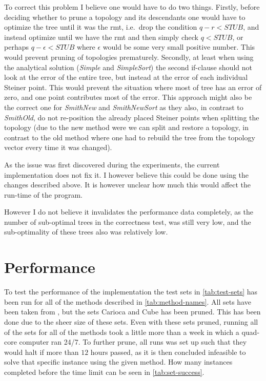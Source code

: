 To correct this problem I believe one would have to do two things. Firstly,
before deciding whether to prune a topology and its descendants one would have
to optimize the tree until it was the \ac{rmt}, i.e.\ drop the condition $q-r <
\textit{STUB}$, and instead optimize until we have the \ac{rmt} and then simply
check $q < \textit{STUB}$, or perhaps $q - \epsilon < \textit{STUB}$ where
$\epsilon$ would be some very small positive number. This would prevent pruning
of topologies prematurely. Secondly, at least when using the analytical solution
(\textit{Simple} and \textit{SimpleSort}) the second if-clause should not look
at the error of the entire tree, but instead at the error of each individual
Steiner point. This would prevent the situation where most of tree has an error
of zero, and one point contributes most of the error. This approach might also
be the correct one for \textit{SmithNew} and \textit{SmithNewSort} as they also, in
contrast to \textit{SmithOld}, do not re-position the already placed Steiner
points when splitting the topology (due to the new method were we can split and
restore a topology, in contrast to the old method where one had to rebuild the
tree from the topology vector every time it was changed).

As the issue was first discovered during the experiments, the current
implementation does not fix it. I however believe this could be done using the
changes described above. It is however unclear how much this would affect the
run-time of the program.

However I do not believe it invalidates the performance data completely, as the
number of sub-optimal trees in the correctness test, was still very low, and the
sub-optimality of these trees also was relatively low.

\section{Performance}
\label{sec:performance}

To test the performance of the implementation the test sets in
\cref{tab:test-sets} has been run for all of the methods described in
\cref{tab:method-names}. All sets have been taken from \textcite{fonseca2014},
but the sets Carioca and Cube has been pruned. This has been done due to the
sheer size of these sets. Even with these sets pruned, running all of the sets
for all of the methods took a little more than a week in which a quad-core
computer ran 24/7. To further prune, all runs was set up such that they would
halt if more than $12$ hours passed, as it is then concluded infeasible to solve
that specific instance using the given method. How many instances completed
before the time limit can be seen in \cref{tab:set-success}.

